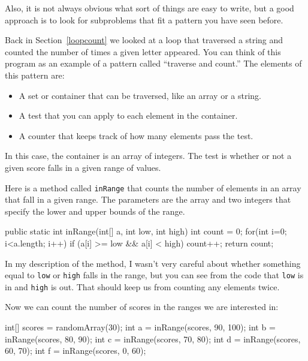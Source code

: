 \documentclass{book}
\begin{document}
Also, it is not always obvious what sort of things are easy to write,
but a good approach is to look for subproblems that fit a pattern you
have seen before.

Back in Section~\ref{loopcount} we looked at a loop that traversed a
string and counted the number of times a given letter appeared.  You
can think of this program as an example of a pattern called ``traverse
and count.''  The elements of this pattern are:

\begin{itemize}

\item A set or container that can be traversed, like an array
or a string.

\item A test that you can apply to each element in the container.

\item A counter that keeps track of how many elements pass
the test.

\end{itemize}

In this case, the container is an array of integers.  The
test is whether or not a given score falls in a given range of
values.

Here is a method called {\tt inRange}
that counts the number of elements in an array that fall
in a given range.  The parameters are the array and two
integers that specify the lower and upper bounds of
the range.

\begin{verbatimtab}
public static int inRange(int[] a, int low, int high) {
    int count = 0;
    for(int i=0; i<a.length; i++) {
        if (a[i] >= low && a[i] < high) count++;
    }
    return count;
}
\end{verbatimtab}
%
In my description of the method,
I wasn't very careful about whether something equal
to {\tt low} or {\tt high} falls in the range, but you can
see from the code that {\tt low} is in and {\tt high} is out.
That should keep us from counting any elements twice.

Now we can count the number of scores in the ranges we are
interested in:

\begin{verbatimtab}
int[] scores = randomArray(30);
int a = inRange(scores, 90, 100);
int b = inRange(scores, 80, 90);
int c = inRange(scores, 70, 80);
int d = inRange(scores, 60, 70);
int f = inRange(scores, 0, 60);
\end{verbatimtab}
\end{document}
